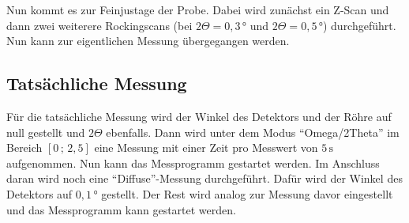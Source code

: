 Nun kommt es zur Feinjustage der Probe.
Dabei wird zunächst ein Z-Scan und dann zwei weiterere Rockingscans (bei $2 \Theta = 0{,}3 \, °$ und $2 \Theta = 0{,}5 \, °$) durchgeführt.
Nun kann zur eigentlichen Messung übergegangen werden.

\subsection{Tatsächliche Messung}
Für die tatsächliche Messung wird der Winkel des Detektors und der Röhre auf null gestellt und $2 \Theta$ ebenfalls.
Dann wird unter dem Modus \enquote{Omega/2Theta} im Bereich $[0 \, ; \, 2{,}5]$ eine Messung mit einer Zeit pro Messwert von $5  \, \unit\second$ aufgenommen.
Nun kann das Messprogramm gestartet werden.
Im Anschluss daran wird noch eine \enquote{Diffuse}-Messung durchgeführt.
Dafür wird der Winkel des Detektors auf $0{,}1 \, °$ gestellt.
Der Rest wird analog zur Messung davor eingestellt und das Messprogramm kann gestartet werden.